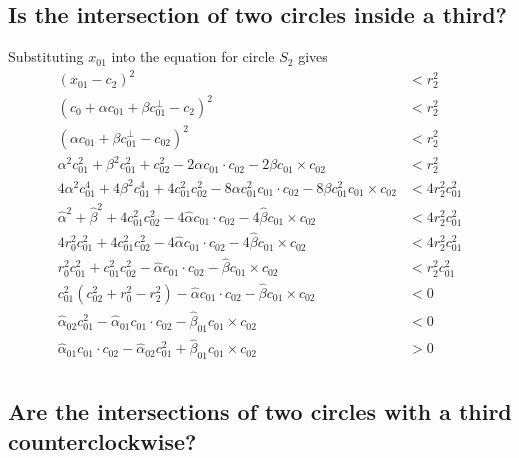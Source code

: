 \documentclass[11pt]{article}
\begin{document}
\subsection{Is the intersection of two circles inside a third?}

Substituting $x_{01}$ into the equation for circle $S_2$ gives
\begin{align*}
(x_{01} - c_2)^2 &< r_2^2 \\
(c_0 + \alpha c_{01} + \beta c_{01}^\perp - c_2)^2 &< r_2^2 \\
(\alpha c_{01} + \beta c_{01}^\perp - c_{02})^2 &< r_2^2 \\
\alpha^2 c_{01}^2 + \beta^2 c_{01}^2 + c_{02}^2 - 2 \alpha c_{01}\cdot c_{02} - 2 \beta c_{01}\times c_{02} &< r_2^2 \\
4\alpha^2 c_{01}^4 + 4\beta^2 c_{01}^4 + 4c_{01}^2 c_{02}^2 - 8 \alpha c_{01}^2 c_{01}\cdot c_{02} - 8 \beta c_{01}^2 c_{01}\times c_{02} &< 4r_2^2 c_{01}^2 \\
\hat{\alpha}^2 + \hat{\beta}^2 + 4c_{01}^2 c_{02}^2 - 4 \hat{\alpha} c_{01}\cdot c_{02} - 4 \hat{\beta} c_{01}\times c_{02} &< 4r_2^2 c_{01}^2 \\
4 r_0^2 c_{01}^2 + 4 c_{01}^2 c_{02}^2 - 4 \hat{\alpha} c_{01}\cdot c_{02} - 4 \hat{\beta} c_{01}\times c_{02} &< 4r_2^2 c_{01}^2 \\
r_0^2 c_{01}^2 + c_{01}^2 c_{02}^2 - \hat{\alpha} c_{01}\cdot c_{02} - \hat{\beta} c_{01}\times c_{02} &< r_2^2 c_{01}^2 \\
c_{01}^2 (c_{02}^2 + r_0^2 - r_2^2) - \hat{\alpha} c_{01}\cdot c_{02} - \hat{\beta} c_{01}\times c_{02} &< 0 \\
\hat{\alpha}_{02} c_{01}^2 - \hat{\alpha}_{01} c_{01}\cdot c_{02} - \hat{\beta}_{01} c_{01}\times c_{02} &< 0 \\
\hat{\alpha}_{01} c_{01}\cdot c_{02} - \hat{\alpha}_{02} c_{01}^2 + \hat{\beta}_{01} c_{01}\times c_{02} &> 0 \\
\end{align*}

\subsection{Are the intersections of two circles with a third counterclockwise?}
\end{document}
